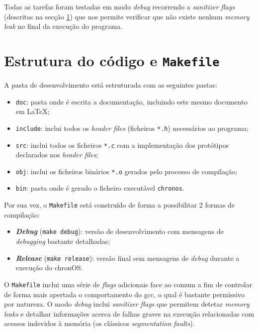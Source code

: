 \documentclass[10pt,oneside]{estiloUBI}
\newcommand{\chronOS}{\textsf{chronOS}}
\begin{document}
	Todas as tarefas foram testadas em modo \textit{debug} recorrendo a \textit{sanitizer flags} (descritas na secção \ref{ssec:dev:struct_makefile}) que nos permite verificar que não existe nenhum \textit{memory leak} no final da execução do programa.
	
	
	\section{Estrutura do código e \texttt{Makefile}}
	\label{ssec:dev:struct_makefile}
	
	A pasta de desenvolvimento está estruturada com as seguintes pastas:
	
	\begin{itemize}
		\item \verb|doc|: pasta onde é escrita a documentação, incluindo este mesmo documento em \LaTeX;
		\item \verb|include|: inclui todos os \textit{header files} (ficheiros \verb|*.h|) necessários ao programa;
		\item \verb|src|: inclui todos os ficheiros \verb|*.c| com a implementação dos protótipos declarados nos \textit{header files};
		\item \verb|obj|: inclui os ficheiros binários \verb|*.o| gerados pelo processo de compilação;
		\item \verb|bin|: pasta onde é gerado o ficheiro executável \verb|chronos|.
	\end{itemize}

	Por sua vez, o \texttt{Makefile} está construído de forma a possibilitar 2 formas de compilação:
	
	\begin{itemize}
		\item \textbf{\textit{Debug}} (\verb|make debug|): versão de desenvolvimento com mensagens de \textit{debugging} bastante detalhadas;
		
		\item \textbf{\textit{Release}} (\verb|make release|): versão final sem mensagens de \textit{debug} durante a execução do \chronOS.
	\end{itemize}

	O \texttt{Makefile} inclui uma série de \textit{flags} adicionais face ao comum a fim de controlar de forma mais apertada o comportamento do \ac{gcc}, o qual é bastante permissivo por natureza. O modo \textit{debug} inclui \textit{sanitizer flags} que permitem detetar \textit{memory leaks} e detalhar informações acerca de falhas graves na execução relacionadas com acessos indevidos à memória (os clássicos \textit{segmentation faults}).
	
\end{document}
